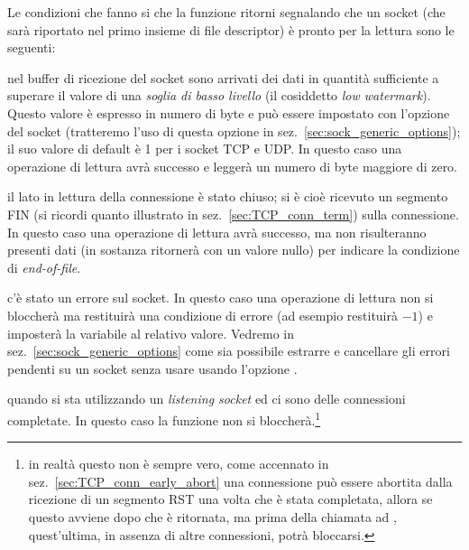 Le condizioni che fanno si che la funzione  ritorni segnalando
che un socket (che sarà riportato nel primo insieme di file descriptor) è
pronto per la lettura sono le seguenti:
\begin{itemize*}
\item nel buffer di ricezione del socket sono arrivati dei dati in quantità
  sufficiente a superare il valore di una \textsl{soglia di basso livello} (il
  cosiddetto \textit{low watermark}). Questo valore è espresso in numero di
  byte e può essere impostato con l'opzione del socket 
  (tratteremo l'uso di questa opzione in sez.~\ref{sec:sock_generic_options});
  il suo valore di default è 1 per i socket TCP e UDP. In questo caso una
  operazione di lettura avrà successo e leggerà un numero di byte maggiore di
  zero.
\item il lato in lettura della connessione è stato chiuso; si è cioè ricevuto
  un segmento FIN (si ricordi quanto illustrato in
  sez.~\ref{sec:TCP_conn_term}) sulla connessione. In questo caso una
  operazione di lettura avrà successo, ma non risulteranno presenti dati (in
  sostanza  ritornerà con un valore nullo) per indicare la
  condizione di \textit{end-of-file}.
\item c'è stato un errore sul socket. In questo caso una operazione di lettura
  non si bloccherà ma restituirà una condizione di errore (ad esempio
   restituirà $-1$) e imposterà la variabile  al relativo
  valore. Vedremo in sez.~\ref{sec:sock_generic_options} come sia possibile
  estrarre e cancellare gli errori pendenti su un socket senza usare
   usando l'opzione .
\item quando si sta utilizzando un \textit{listening socket} ed ci sono delle
  connessioni completate. In questo caso la funzione  non si
  bloccherà.\footnote{in realtà questo non è sempre vero, come accennato in
    sez.~\ref{sec:TCP_conn_early_abort} una connessione può essere abortita
    dalla ricezione di un segmento RST una volta che è stata completata,
    allora se questo avviene dopo che  è ritornata, ma prima
    della chiamata ad , quest'ultima, in assenza di altre
    connessioni, potrà bloccarsi.}
\end{itemize*}

